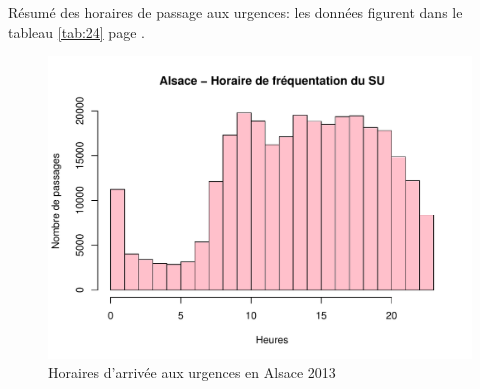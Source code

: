 \documentclass[12pt,english,french,twoside]{report}\usepackage[]{graphicx}\usepackage[]{color}
\makeatletter
\def\maxwidth{ %
  \ifdim\Gin@nat@width>\linewidth
    \linewidth
  \else
    \Gin@nat@width
  \fi
}
\newenvironment{kframe}{%
 \def\at@end@of@kframe{}%
 \ifinner\ifhmode%
  \def\at@end@of@kframe{\end{minipage}}%
  \begin{minipage}{\columnwidth}%
 \fi\fi%
 \def\FrameCommand##1{\hskip\@totalleftmargin \hskip-\fboxsep
 \colorbox{shadecolor}{##1}\hskip-\fboxsep
     \hskip-\linewidth \hskip-\@totalleftmargin \hskip\columnwidth}%
 \MakeFramed {\advance\hsize-\width
   \@totalleftmargin\z@ \linewidth\hsize
   \@setminipage}}%
 {\par\unskip\endMakeFramed%
 \at@end@of@kframe}
\newenvironment{knitrout}{}{} %
\makeatother
\begin{document}
Résumé des horaires de passage aux urgences: les données figurent dans le tableau \ref{tab:24} page \pageref{tab:24}.
\begin{kframe}


{\ttfamily\noindent\bfseries{}}\end{kframe}


% 

\begin{figure}
\begin{center}
\begin{knitrout}
\color{fgcolor}
\includegraphics[width=\maxwidth]{figure/test23} 

\end{knitrout}

\end{center}
\caption{Horaires d'arrivée aux urgences en Alsace 2013}
\label{passage:als}
\end{figure}
\end{document}
